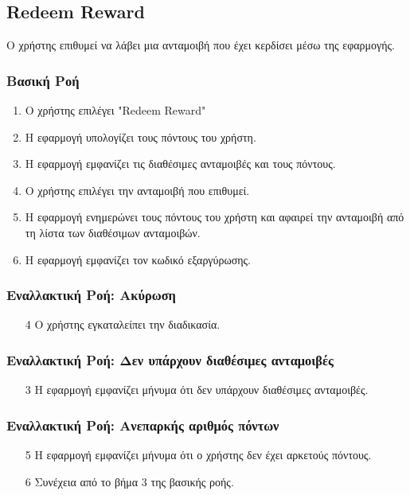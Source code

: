 \subsection{Redeem Reward}

Ο χρήστης επιθυμεί να λάβει μια ανταμοιβή που έχει κερδίσει μέσω
της εφαρμογής.

\subsubsection{Βασική Ροή}

\begin{enumerate}
    \item Ο χρήστης επιλέγει "Redeem Reward"
    \item Η εφαρμογή υπολογίζει τους πόντους του χρήστη.
    \item Η εφαρμογή εμφανίζει τις διαθέσιμες ανταμοιβές και τους πόντους.
    \item Ο χρήστης επιλέγει την ανταμοιβή που επιθυμεί.
    \item Η εφαρμογή ενημερώνει τους πόντους του χρήστη και αφαιρεί την ανταμοιβή
          από τη λίστα των διαθέσιμων ανταμοιβών.
    \item Η εφαρμογή εμφανίζει τον κωδικό εξαργύρωσης.
\end{enumerate}

\subsubsection{Εναλλακτική Ροή: Ακύρωση}

\begin{enumerate}
    \item[4] Ο χρήστης εγκαταλείπει την διαδικασία.
\end{enumerate}

\subsubsection{Εναλλακτική Ροή: Δεν υπάρχουν διαθέσιμες ανταμοιβές}

\begin{enumerate}
    \item[3] Η εφαρμογή εμφανίζει μήνυμα ότι δεν υπάρχουν διαθέσιμες ανταμοιβές.
\end{enumerate}

\subsubsection{Εναλλακτική Ροή: Ανεπαρκής αριθμός πόντων}

\begin{enumerate}
    \item[5] Η εφαρμογή εμφανίζει μήνυμα ότι ο χρήστης δεν έχει αρκετούς πόντους.
    \item[6] Συνέχεια από το βήμα 3 της βασικής ροής.
\end{enumerate}
